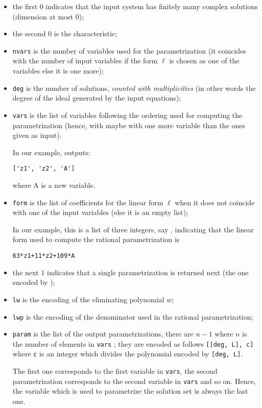 \documentclass[a4paper,english,11pt]{scrartcl}
\def\tt{\ttfamily}
\theoremstyle{definition}
\theoremstyle{remark}
\begin{document}
\begin{itemize}
\item the first $0$ indicates that the input system has finitely
  many complex solutions (dimension at most $0$);
\item the second $0$ is the characteristic;
\item \texttt{nvars} is the number of variables used for the parametrization (it
  coincides with the number of input variables if the form $\ell$ is chosen
  as one of the variables else it is one more);
\item \texttt{deg} is the number of solutions, {\it counted with multiplicities}
  (in other words the degree of the ideal generated by the input equations);
\item \texttt{vars} is the list of variables following the ordering used for
  computing the parametrization (hence, with maybe with one
  more variable than the ones given as input).

  In our example, \msolve outputs:
\begin{verbatim}
['z1', 'z2', 'A']
\end{verbatim}
where {\tt A} is a new variable. 

\item \texttt{form} is the list of coefficients for the linear form $\ell$ when
  it does not coincide with one of the input variables (else it is an empty list);

  In our example, this is a list of three integers, say {\tt [63, 11, 109]}, 
  indicating that the linear form used to compute the rational parametrization is 
\begin{verbatim}
63*z1+11*z2+109*A
\end{verbatim}
\item the next $1$ indicates that a single parametrization is returned next (the one encoded by {\tt [lw, lwp, param]});
\item \texttt{lw} is the encoding of the eliminating polynomial $w$;
\item \texttt{lwp} is the encoding of the denominator used in the rational
  parametrization;
\item \texttt{param} is the list of the output parametrizations, there are $n-1$ where 
    $n$ is the number of elements in \verb+vars+ ; 
    they are encoded as follows \verb+[[deg, L], c]+ where \verb+c+ is 
    an integer which divides the polynomial encoded by \verb+[deg, L]+. 

    The first one corresponds to the first variable in \verb+vars+, the 
    second parametrization corresponds to the second variable in \verb+vars+ 
    and so on. Hence, the variable which is used to parametrize the solution 
    set is always the last one.
\end{itemize}
\end{document}
